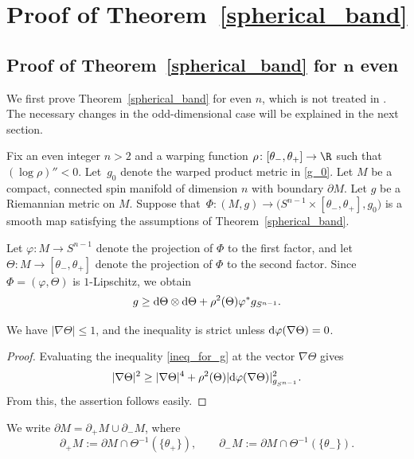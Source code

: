 \section{Proof of Theorem~\ref{spherical_band}}\label{proof_of_band_comparison}

\subsection[Proof of Theorem~\ref{spherical_band} for n even]{Proof of Theorem~\ref{spherical_band} for $\boldsymbol{n}$ even}

We first prove Theorem~\ref{spherical_band} for even $n$, which is not treated in \cite{Cecchini-Zeidler}.
The necessary changes in the odd-dimensional case will be explained in the next section.

Fix an even integer $n>2$ and a warping function $\rho\colon [\theta_- , \theta_+] \to \R$ such that $(\log \rho)''<0$.
Let~$g_0$ denote the warped product metric in \eqref{g_0}.
Let $M$ be a compact, connected spin manifold of dimension $n$ with boundary $\partial M$.
Let $g$ be a Riemannian metric on $M$.
Suppose that~${\Phi\colon (M,g) \to \big(S^{n-1} \times [\theta_-,\theta_+],g_0\big)}$ is a smooth map satisfying the assumptions of Theorem~\ref{spherical_band}.

Let $\varphi\colon M \to S^{n-1}$ denote the projection of $\Phi$ to the first factor, and let $\Theta\colon M \to [\theta_-,\theta_+]$ denote the projection of $\Phi$ to the second factor. Since $\Phi = (\varphi,\Theta)$ is $1$-Lipschitz, we obtain
\begin{equation} \label{ineq_for_g}
 g \geq {\rm d}\Theta \otimes {\rm d}\Theta + \rho^2(\Theta) \varphi^* g_{S^{n-1}}.
\end{equation}

\begin{Lemma}
\label{gradient_of_Theta}
We have $|\nabla \Theta| \leq 1$, and the inequality is strict unless ${\rm d}\varphi(\nabla \Theta) = 0$.
\end{Lemma}

\begin{proof}
Evaluating the inequality \eqref{ineq_for_g} at the vector $\nabla \Theta$ gives
\[|\nabla \Theta|^2 \geq |\nabla \Theta|^4 + \rho^2(\Theta) |{\rm d}\varphi(\nabla \Theta)|_{g_{S^{n-1}}}^2.\]
From this, the assertion follows easily.
\end{proof}

We write $\partial M = \partial_+ M \cup \partial_- M$, where
\[
\partial_+ M := \partial M \cap \Theta^{-1}(\{\theta_+\}), \qquad \partial_- M := \partial M \cap \Theta^{-1}(\{\theta_-\}).
\]

